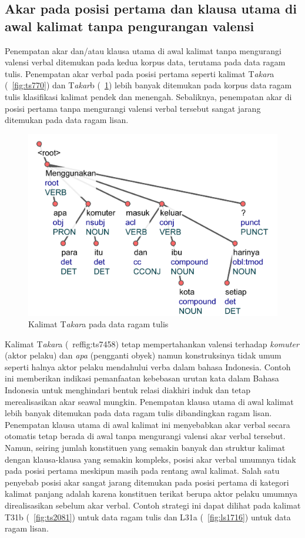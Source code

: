 \subsection{Akar pada posisi pertama dan klausa utama di awal kalimat tanpa pengurangan valensi}
Penempatan akar dan/atau klausa utama di awal kalimat tanpa mengurangi valensi verbal ditemukan pada kedua korpus data, terutama pada data ragam tulis. Penempatan akar verbal pada posisi pertama seperti kalimat T\textit{akar}a (\pic~\ref{fig:ts770}) dan T\textit{akar}b (\pic~\ref{fig:ts7458}) lebih banyak ditemukan pada korpus data ragam tulis klasifikasi kalimat pendek dan menengah. Sebaliknya, penempatan akar di posisi pertama tanpa mengurangi valensi verbal tersebut sangat jarang ditemukan pada data ragam lisan.

\begin{figure}
\centering
  \includegraphics[width=.57\textwidth]{pics/ts7458.jpg} 
	\caption{Kalimat T\textit{akar}a pada data ragam tulis}
	\label{fig:ts7458} 
\end{figure}

Kalimat T\textit{akar}a (\pic~ref{fig:ts7458}) tetap mempertahankan valensi terhadap \textit{komuter} (aktor pelaku) dan \textit{apa} (pengganti obyek) namun konstruksinya tidak umum seperti halnya aktor pelaku mendahului verba dalam bahasa Indonesia. Contoh ini memberikan indikasi pemanfaatan kebebasan urutan kata dalam Bahasa Indonesia untuk menghindari bentuk relasi diakhiri induk dan tetap merealisasikan akar seawal mungkin. Penempatan klausa utama di awal kalimat lebih banyak ditemukan pada data ragam tulis dibandingkan ragam lisan. Penempatan klausa utama di awal kalimat ini menyebabkan akar verbal secara otomatis tetap berada di awal tanpa mengurangi valensi akar verbal tersebut. Namun, seiring jumlah konstituen yang semakin banyak dan struktur kalimat dengan klausa-klausa yang semakin kompleks, posisi akar verbal umumnya tidak pada posisi pertama meskipun masih pada rentang awal kalimat. Salah satu penyebab posisi akar sangat jarang ditemukan pada posisi pertama di kategori kalimat panjang adalah karena konstituen terikat berupa aktor pelaku umumnya direalisasikan sebelum akar verbal. Contoh strategi ini dapat dilihat pada kalimat T31b (\pic~\ref{fig:ts2081}) untuk data ragam tulis dan L31a (\pic~\ref{fig:ls1716}) untuk data ragam lisan.


